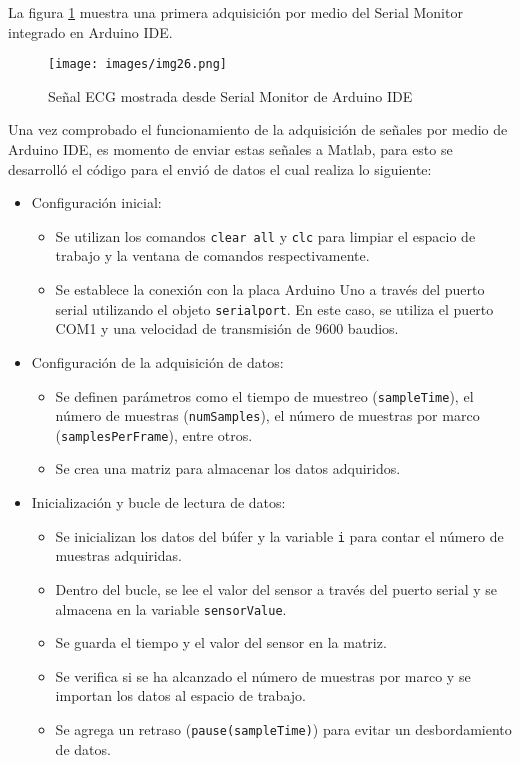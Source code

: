 La figura  \ref{fig:SerialMonitor} muestra una primera adquisición por medio del Serial Monitor integrado en Arduino IDE.

\begin{figure}[!ht]
    \centering
    \texttt{[image: images/img26.png]}
    \caption{Señal ECG mostrada desde Serial Monitor de Arduino IDE}
    \label{fig:SerialMonitor}
\end{figure}

Una vez comprobado el funcionamiento de la adquisición de señales por medio de Arduino IDE, es momento de enviar estas señales a Matlab, para esto se desarrolló el código para el envió de datos el cual realiza lo siguiente:

\begin{itemize}
    \item Configuración inicial:
          \begin{itemize}
              \item Se utilizan los comandos \texttt{clear all} y \texttt{clc} para limpiar el espacio de trabajo y la ventana de comandos respectivamente.
              \item Se establece la conexión con la placa Arduino Uno a través del puerto serial utilizando el objeto \texttt{serialport}. En este caso, se utiliza el puerto COM1 y una velocidad de transmisión de 9600 baudios.
          \end{itemize}

    \item Configuración de la adquisición de datos:
          \begin{itemize}
              \item Se definen parámetros como el tiempo de muestreo (\texttt{sampleTime}), el número de muestras (\texttt{numSamples}), el número de muestras por marco (\texttt{samplesPerFrame}), entre otros.
              \item Se crea una matriz para almacenar los datos adquiridos.
          \end{itemize}

    \item Inicialización y bucle de lectura de datos:
          \begin{itemize}
              \item Se inicializan los datos del búfer  y la variable \texttt{i} para contar el número de muestras adquiridas.
              \item Dentro del bucle, se lee el valor del sensor a través del puerto serial y se almacena en la variable \texttt{sensorValue}.
              \item Se guarda el tiempo y el valor del sensor en la matriz.
              \item Se verifica si se ha alcanzado el número de muestras por marco y se importan los datos al espacio de trabajo.
              \item Se agrega un retraso (\texttt{pause(sampleTime)}) para evitar un desbordamiento de datos.
          \end{itemize}


\end{itemize}
